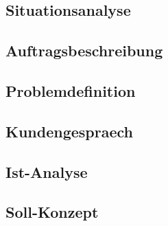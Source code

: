 \subsection{Situationsanalyse}
  \blindtext[1]
\subsection{Auftragsbeschreibung}
  \blindtext
\subsection{Problemdefinition}
  \blindtext
\subsection{Kundengespraech}
  \blindtext
\subsection{Ist-Analyse}
  \blindtext
\subsection{Soll-Konzept}
  \blindtext
